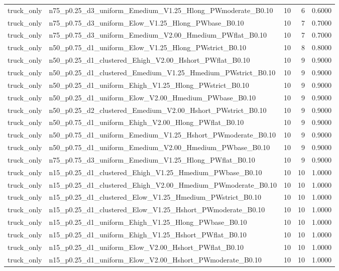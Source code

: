 \begin{tabular}{llrrr}
truck_only & n75_p0.25_d3_uniform_Emedium_V1.25_Hlong_PWmoderate_B0.10 & 10 & 6 & 0.6000 \\
truck_only & n75_p0.75_d3_uniform_Elow_V1.25_Hlong_PWbase_B0.10 & 10 & 7 & 0.7000 \\
truck_only & n75_p0.75_d3_uniform_Emedium_V2.00_Hmedium_PWflat_B0.10 & 10 & 7 & 0.7000 \\
truck_only & n50_p0.75_d1_uniform_Elow_V1.25_Hlong_PWstrict_B0.10 & 10 & 8 & 0.8000 \\
truck_only & n50_p0.25_d1_clustered_Ehigh_V2.00_Hshort_PWflat_B0.10 & 10 & 9 & 0.9000 \\
truck_only & n50_p0.25_d1_clustered_Emedium_V1.25_Hmedium_PWstrict_B0.10 & 10 & 9 & 0.9000 \\
truck_only & n50_p0.25_d1_uniform_Ehigh_V1.25_Hlong_PWstrict_B0.10 & 10 & 9 & 0.9000 \\
truck_only & n50_p0.25_d1_uniform_Elow_V2.00_Hmedium_PWbase_B0.10 & 10 & 9 & 0.9000 \\
truck_only & n50_p0.25_d2_clustered_Emedium_V2.00_Hshort_PWstrict_B0.10 & 10 & 9 & 0.9000 \\
truck_only & n50_p0.75_d1_uniform_Ehigh_V2.00_Hlong_PWflat_B0.10 & 10 & 9 & 0.9000 \\
truck_only & n50_p0.75_d1_uniform_Emedium_V1.25_Hshort_PWmoderate_B0.10 & 10 & 9 & 0.9000 \\
truck_only & n50_p0.75_d1_uniform_Emedium_V2.00_Hmedium_PWbase_B0.10 & 10 & 9 & 0.9000 \\
truck_only & n75_p0.75_d3_uniform_Emedium_V1.25_Hlong_PWflat_B0.10 & 10 & 9 & 0.9000 \\
truck_only & n15_p0.25_d1_clustered_Ehigh_V1.25_Hmedium_PWbase_B0.10 & 10 & 10 & 1.0000 \\
truck_only & n15_p0.25_d1_clustered_Ehigh_V2.00_Hmedium_PWmoderate_B0.10 & 10 & 10 & 1.0000 \\
truck_only & n15_p0.25_d1_clustered_Elow_V1.25_Hmedium_PWstrict_B0.10 & 10 & 10 & 1.0000 \\
truck_only & n15_p0.25_d1_clustered_Elow_V1.25_Hshort_PWmoderate_B0.10 & 10 & 10 & 1.0000 \\
truck_only & n15_p0.25_d1_uniform_Ehigh_V1.25_Hlong_PWbase_B0.10 & 10 & 10 & 1.0000 \\
truck_only & n15_p0.25_d1_uniform_Ehigh_V1.25_Hshort_PWflat_B0.10 & 10 & 10 & 1.0000 \\
truck_only & n15_p0.25_d1_uniform_Elow_V2.00_Hshort_PWflat_B0.10 & 10 & 10 & 1.0000 \\
truck_only & n15_p0.25_d1_uniform_Elow_V2.00_Hshort_PWmoderate_B0.10 & 10 & 10 & 1.0000 \\

\end{tabular}
